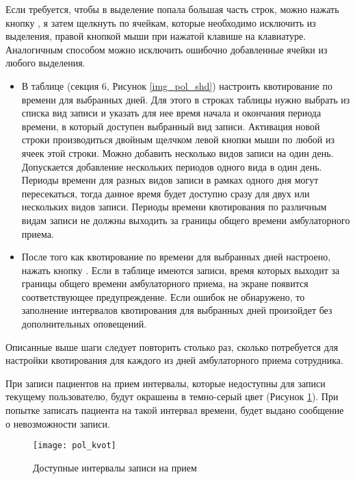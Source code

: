\begin{prim}
 Если требуется, чтобы в выделение попала большая часть строк, можно нажать кнопку , я затем щелкнуть по ячейкам, которые необходимо исключить из выделения, правой кнопкой мыши при нажатой клавише  на клавиатуре. Аналогичным способом можно исключить ошибочно добавленные ячейки из любого выделения.
\end{prim}

\begin{itemize}
 \item В таблице  (секция 6, Рисунок \ref{img_pol_shd}) настроить квотирование по времени для выбранных дней. Для этого в строках таблицы нужно выбрать из списка вид записи и указать для нее время начала и окончания периода времени, в который доступен выбранный вид записи. Активация новой строки производиться двойным щелчком левой кнопки мыши по любой из ячеек этой строки. Можно добавить несколько видов записи на один день. Допускается добавление нескольких периодов одного вида в один день. Периоды времени для разных видов записи в рамках одного дня могут пересекаться, тогда данное время будет доступно сразу для двух или нескольких видов записи. Периоды времени квотирования по различным видам записи не должны выходить за границы общего времени амбулаторного приема.
 \item После того как квотирование по времени для выбранных дней настроено, нажать кнопку . Если в таблице  имеются записи, время которых выходит за границы общего времени амбулаторного приема, на экране появится соответствующее предупреждение. Если ошибок не обнаружено, то заполнение интервалов квотирования для выбранных дней произойдет без дополнительных оповещений.
\end{itemize}
 
Описанные выше шаги следует повторить столько раз, сколько потребуется для настройки квотирования для каждого из дней амбулаторного приема сотрудника.

При записи пациентов на прием интервалы, которые недоступны для записи текущему пользователю, будут окрашены в темно-серый цвет (Рисунок \ref{img_pol_kvot}). При попытке записать пациента на такой интервал времени, будет выдано сообщение о невозможности записи.

\begin{figure}[ht]\centering
 \texttt{[image: pol\_kvot]}
 \caption{Доступные интервалы записи на прием}
 \label{img_pol_kvot}
\end{figure}

